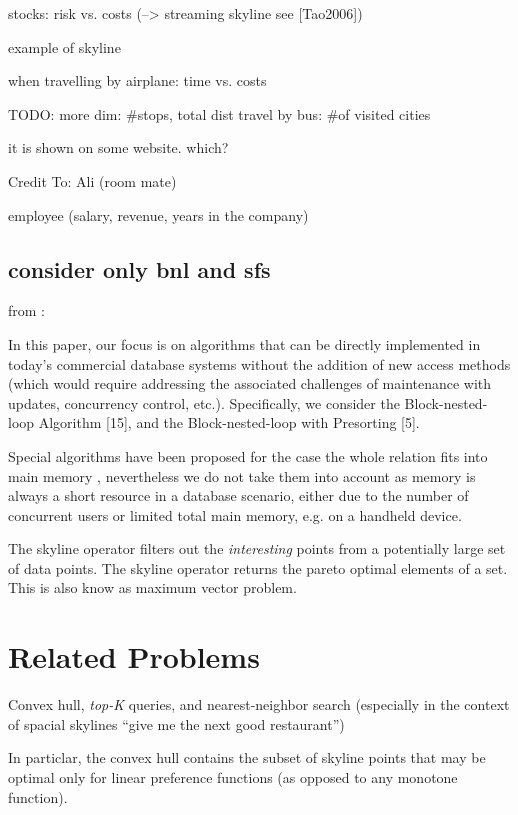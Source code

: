 stocks: risk vs. costs (--> streaming skyline see [Tao2006])

example of skyline

when travelling by airplane: time vs. costs

TODO: more dim: \#stops, total dist
travel by bus: \#of visited cities

it is shown on some website. which?

Credit To: Ali (room mate)

employee (salary, revenue, years in the company)

\subsection{consider only bnl and sfs}

from \citep{Chaudhuri2006}:

In this paper, our focus is on algorithms that can be
directly implemented in today's commercial database systems
without the addition of new access methods (which
would require addressing the associated challenges of maintenance
with updates, concurrency control, etc.). Specifically,
we consider the Block-nested-loop Algorithm [15],
and the Block-nested-loop with Presorting [5].

Special algorithms have been proposed for the case the whole relation fits into main memory \citep{Preparata1985}, nevertheless we do not take them into account as memory is always a short resource in a database scenario, either due to the number of concurrent users or limited total main memory, e.g. on a handheld device.

The skyline operator \citep{Borzsonyi2001} filters out the \emph{interesting} points from a potentially large set of data points. The skyline operator returns the pareto optimal elements of a set. This is also know as maximum vector problem.

\section{Related Problems}
Convex hull, \emph{top-K} queries, and nearest-neighbor search (especially in the context of spacial skylines ``give me the next good restaurant'')

In particlar, the convex hull contains the subset of skyline points that may be optimal only for linear preference functions (as opposed to any monotone function).





